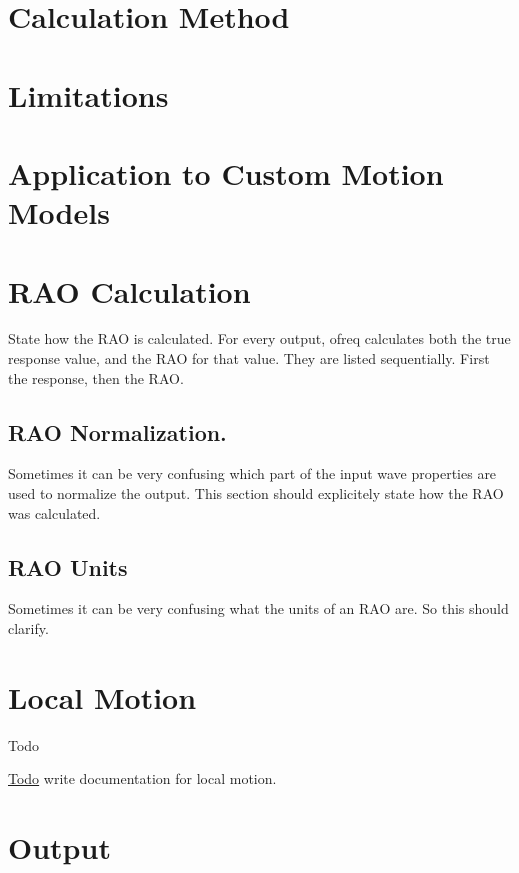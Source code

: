 \section*{Calculation Method}

\section*{Limitations}

\section*{Application to Custom Motion Models}

\section*{R\-A\-O Calculation}

State how the R\-A\-O is calculated. For every output, ofreq calculates both the true response value, and the R\-A\-O for that value. They are listed sequentially. First the response, then the R\-A\-O.

\subsection*{R\-A\-O Normalization.}

Sometimes it can be very confusing which part of the input wave properties are used to normalize the output. This section should explicitely state how the R\-A\-O was calculated.

\subsection*{R\-A\-O Units}

Sometimes it can be very confusing what the units of an R\-A\-O are. So this should clarify. \hypertarget{local_motion}{}\section{Local Motion}\label{local_motion}
\begin{DoxyRefDesc}{Todo}
\item[\hyperlink{todo__todo000026}{Todo}]write documentation for local motion.\end{DoxyRefDesc}


\section*{Output}


